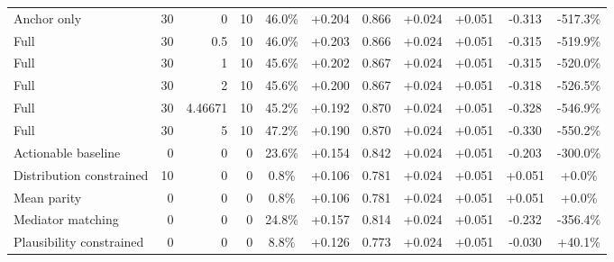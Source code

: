 \begin{table}[htbp]
\begin{tabular}{lrrrccccccc}
Anchor only & 30 & 0 & 10 & 46.0\% & +0.204 & 0.866 & +0.024 & +0.051 & -0.313 & -517.3\% \\
Full & 30 & 0.5 & 10 & 46.0\% & +0.203 & 0.866 & +0.024 & +0.051 & -0.315 & -519.9\% \\
Full & 30 & 1 & 10 & 45.6\% & +0.202 & 0.867 & +0.024 & +0.051 & -0.315 & -520.0\% \\
Full & 30 & 2 & 10 & 45.6\% & +0.200 & 0.867 & +0.024 & +0.051 & -0.318 & -526.5\% \\
Full & 30 & 4.46671 & 10 & 45.2\% & +0.192 & 0.870 & +0.024 & +0.051 & -0.328 & -546.9\% \\
Full & 30 & 5 & 10 & 47.2\% & +0.190 & 0.870 & +0.024 & +0.051 & -0.330 & -550.2\% \\
Actionable baseline & 0 & 0 & 0 & 23.6\% & +0.154 & 0.842 & +0.024 & +0.051 & -0.203 & -300.0\% \\
Distribution constrained & 10 & 0 & 0 & 0.8\% & +0.106 & 0.781 & +0.024 & +0.051 & +0.051 & +0.0\% \\
Mean parity & 0 & 0 & 0 & 0.8\% & +0.106 & 0.781 & +0.024 & +0.051 & +0.051 & +0.0\% \\
Mediator matching & 0 & 0 & 0 & 24.8\% & +0.157 & 0.814 & +0.024 & +0.051 & -0.232 & -356.4\% \\
Plausibility constrained & 0 & 0 & 0 & 8.8\% & +0.126 & 0.773 & +0.024 & +0.051 & -0.030 & +40.1\% \\
\bottomrule
\end{tabular}
\end{table}